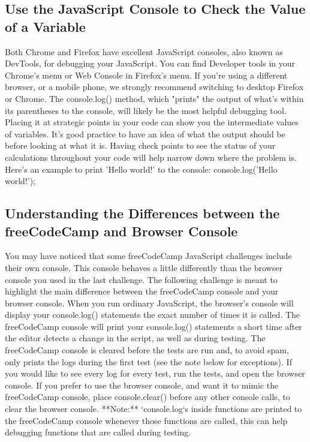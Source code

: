 \documentclass{article}%
\begin{document}
\subsection{Use the JavaScript Console to Check the Value of a Variable}%
\label{subsec:UsetheJavaScriptConsoletoChecktheValueofaVariable}%
Both Chrome and Firefox have excellent JavaScript consoles, also known as DevTools, for debugging your JavaScript.\newline%
You can find Developer tools in your Chrome's menu or Web Console in Firefox's menu. If you're using a different browser, or a mobile phone, we strongly recommend switching to desktop Firefox or Chrome.\newline%
The console.log() method, which "prints" the output of what's within its parentheses to the console, will likely be the most helpful debugging tool. Placing it at strategic points in your code can show you the intermediate values of variables. It's good practice to have an idea of what the output should be before looking at what it is. Having check points to see the status of your calculations throughout your code will help narrow down where the problem is.\newline%
Here's an example to print 'Hello world!' to the console:\newline%
console.log('Hello world!');\newline%

%
\subsection{Understanding the Differences between the freeCodeCamp and Browser Console}%
\label{subsec:UnderstandingtheDifferencesbetweenthefreeCodeCampandBrowserConsole}%
You may have noticed that some freeCodeCamp JavaScript challenges include their own console. This console behaves a little differently than the browser console you used in the last challenge.\newline%
The following challenge is meant to highlight the main difference between the freeCodeCamp console and your browser console.\newline%
When you run ordinary JavaScript, the browser's console will display your console.log() statements the exact number of times it is called.\newline%
The freeCodeCamp console will print your console.log() statements a short time after the editor detects a change in the script, as well as during testing.\newline%
The freeCodeCamp console is cleared before the tests are run and, to avoid spam, only prints the logs during the first test (see the note below for exceptions).\newline%
If you would like to see every log for every test, run the tests, and open the browser console. If you prefer to use the browser console, and want it to mimic the freeCodeCamp console, place console.clear() before any other console calls, to clear the browser console.\newline%
**Note:** `console.log`s inside functions are printed to the freeCodeCamp console whenever those functions are called, this can help debugging functions that are called during testing.\newline%
\end{document}
